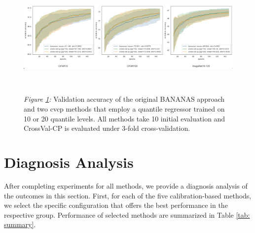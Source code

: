 \documentclass[a4paper,oneside,bibliography=totoc]{scrbook}
\begin{document}
\begin{description}[leftmargin=0cm, listparindent=\parindent]
 	\vspace{0.7em}
	\begin{figure}[H]
		\centering
		\includegraphics[scale=0.295 ]{figs/cvcp_quantile_20.png}
		\label{fig: cvcp_quantile_20}
		\\
 		\parbox{\linewidth}{
 		\vspace{0.2em}
  		{\small \textit{Figure \ref{fig: cvcp_quantile_20}:} Validation accuracy of the original BANANAS approach and two \gls{cvcp} methods that employ a quantile regressor trained on 10 or 20 quantile levels. All methods take 10 initial evaluation and CrossVal-CP is evaluated under 3-fold cross-validation. 
  		}
 	 }	
	\end{figure}	 	
	   	 	
\end{description}
\section{Diagnosis Analysis}
After completing experiments for all methods, we provide a diagnosis analysis of the outcomes in this section. First, for each of the five calibration-based methods, we select the specific configuration that offers the best performance in the respective group. Performance of selected methods are summarized in Table \ref{tab: summary}.
\end{document}
